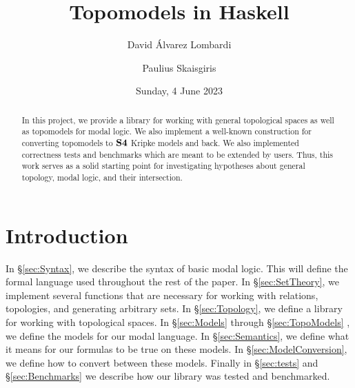 \documentclass[12pt,a4paper]{article}
\title{Topomodels in Haskell}
\author{David Álvarez Lombardi \and Paulius Skaisgiris}
\date{Sunday, 4 June 2023}
\begin{document}
\maketitle

\begin{abstract}
In this project, we provide a library for working with general topological spaces as well as topomodels for modal logic.
We also implement a well-known construction for converting topomodels to $\mathbf{S4}$ Kripke models and back. We also implemented
correctness tests and benchmarks which are meant to be extended by users. Thus, this work serves as a solid starting point for investigating
hypotheses about general topology, modal logic, and their intersection.
\end{abstract}

\tableofcontents

\clearpage

\section{Introduction}

In \S \ref{sec:Syntax}, we describe the syntax of basic modal logic.
This will define the formal language used throughout the rest of the paper.
In \S \ref{sec:SetTheory}, we implement several functions that are necessary for working with relations, topologies, and generating arbitrary sets.
In \S \ref{sec:Topology}, we define a library for working with topological spaces.
In \S \ref{sec:Models} through \S \ref{sec:TopoModels} , we define the models for our modal language.
In \S \ref{sec:Semantics}, we define what it means for our formulas to be true on these models.
In \S \ref{sec:ModelConversion}, we define how to convert between these models.
Finally in \S \ref{sec:tests} and \S \ref{sec:Benchmarks} we describe how our library was tested and benchmarked.


















\end{document}
